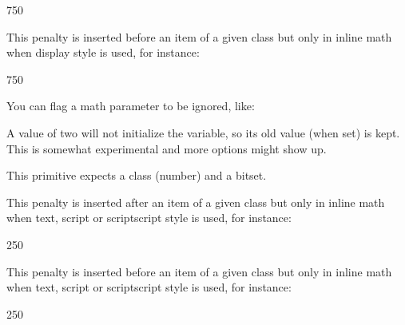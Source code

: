 \starttyping
{} 750
\stoptyping

\stopnewprimitive

\startnewprimitive[title={\prm {setmathdisplayprepenalty}}]

This penalty is inserted before an item of a given class but only in inline math
when display style is used, for instance:

\starttyping
{} 750
\stoptyping

\stopnewprimitive

\startnewprimitive[title={\prm {setmathignore}}]

You can flag a math parameter to be ignored, like:

\starttyping
\setmathignore {}
\setmathignore {}
\setmathignore {}
\setmathignore {}
\setmathignore {}
\stoptyping

A value of two will not initialize the variable, so its old value (when set) is
kept. This is somewhat experimental and more options might show up.

\stopnewprimitive

\startnewprimitive[title={\prm {setmathoptions}}]

This primitive expects a class (number) and a bitset.

\testpage[2]

\starttworows
{}%
\stoptworows

\stopnewprimitive

\startnewprimitive[title={\prm {setmathpostpenalty}}]

This penalty is inserted after an item of a given class but only in inline math
when text, script or scriptscript style is used, for instance:

\starttyping
{} 250
\stoptyping

\stopnewprimitive

\startnewprimitive[title={\prm {setmathprepenalty}}]

This penalty is inserted before an item of a given class but only in inline math
when text, script or scriptscript style is used, for instance:

\starttyping
{} 250
\stoptyping

\stopnewprimitive

\startnewprimitive[title={\prm {setmathspacing}}]

